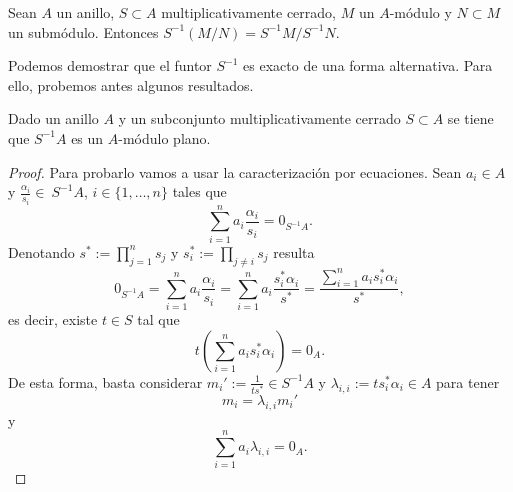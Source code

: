\documentclass[../main.tex]{subfiles}
\begin{document}
	\begin{corollary}\label{cociente_localiza}
	Sean $A$ un anillo, $S \subset A$ multiplicativamente cerrado, $M$ un $A$-módulo y $N \subset M$ un submódulo. Entonces $S^{-1}(M/N) = S^{-1}M / S^{-1}N$.
	\end{corollary}

	Podemos demostrar que el funtor $S^{-1}$ es exacto de una forma alternativa. Para ello, probemos antes algunos resultados.

	\begin{proposition}
		Dado un anillo $A$ y un subconjunto multiplicativamente cerrado $S\subset A$ se tiene que $S^{-1}A$ es un $A$-módulo plano.
	\end{proposition}

	\begin{proof}
		Para probarlo vamos a usar la caracterización por ecuaciones. Sean $a_i\in A$ y $\frac{\alpha_i}{s_i}\in\ S^{-1}A$, $i\in\{1,\dots,n\}$ tales que
		$$\sum_{i=1}^na_i\frac{\alpha_i}{s_i}=0_{S^{-1}A}.$$
		Denotando $s^*:=\prod_{j=1}^ns_j$ y $s_i^*:=\prod_{j\neq i}s_j$ resulta
		$$0_{S^{-1}A}=\sum_{i=1}^na_i\frac{\alpha_i}{s_i}=\sum_{i=1}^na_i\frac{s_i^*\alpha_i}{s^*}=\frac{\sum_{i=1}^na_is_i^*\alpha_i}{s^*},$$
		es decir, existe $t\in S$ tal que
		$$t(\sum_{i=1}^na_is_i^*\alpha_i)=0_A.$$
		De esta forma, basta considerar $m_i':=\frac{1}{ts^*}\in S^{-1}A$ y $\lambda_{i,i}:=ts_i^*\alpha_i\in A$ para tener
		$$m_i=\lambda_{i,i}m_i'$$
		y
		$$\sum_{i=1}^na_i\lambda_{i,i}=0_A.$$
	\end{proof}
\end{document}
